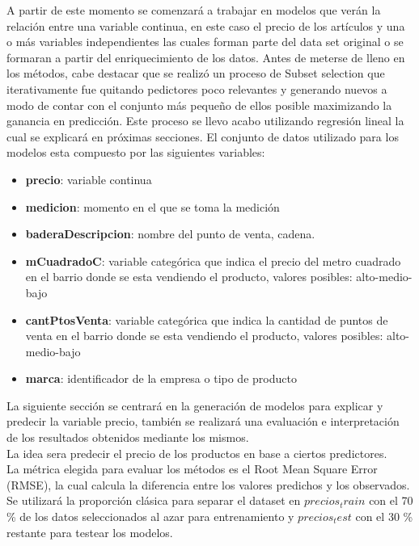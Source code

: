 
A partir de este momento se comenzará a trabajar en modelos que verán la relación entre una variable continua, en este caso el precio de los artículos y una o más variables independientes las cuales forman parte del data set original o se formaran a partir del enriquecimiento de los datos.
Antes de meterse de lleno en los métodos, cabe destacar que se realizó un proceso de Subset selection que iterativamente fue quitando pedictores poco relevantes y generando nuevos a modo de contar con el conjunto más pequeño de ellos posible maximizando la ganancia en predicción. Este proceso se llevo acabo utilizando regresión lineal la cual se explicará en próximas secciones.
El conjunto de datos utilizado para los modelos esta compuesto por las siguientes variables:


\begin{itemize}
  \item \textbf{precio}: variable continua
  \item \textbf{medicion}: momento en el que se toma la medición 
  \item \textbf{baderaDescripcion}: nombre del punto de venta, cadena.
  \item \textbf{mCuadradoC}: variable categórica que indica el precio del metro cuadrado en  el barrio donde se esta vendiendo el producto, valores posibles: alto-medio-bajo
  \item \textbf{cantPtosVenta}: variable categórica que indica la cantidad de puntos de venta en el barrio donde se esta vendiendo el producto, valores posibles: alto-medio-bajo 
  \item \textbf{marca}: identificador de la empresa o tipo de producto
\end{itemize}



La siguiente sección se centrará en la generación de modelos para explicar y predecir la variable precio, también se realizará una evaluación e interpretación de los resultados obtenidos mediante los mismos.\\
La idea sera predecir el precio de los productos en base a ciertos predictores.
\cite{Stat_Learning}\\
La métrica elegida para evaluar los métodos es el Root Mean Square Error (RMSE), la cual calcula la diferencia entre los valores predichos y los observados. Se utilizará la proporción clásica para separar el dataset en $precios_train$ con el 70 \% de los datos seleccionados al azar para entrenamiento y $precios_test$ con el 30 \% restante para testear los modelos.



